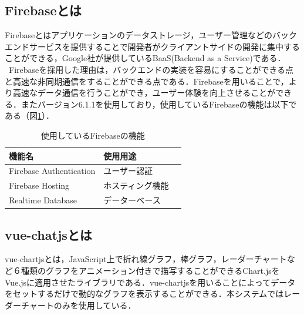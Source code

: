 \documentclass{funthesis}
\begin{document}
\subsection{Firebaseとは}
Firebaseとはアプリケーションのデータストレージ，ユーザー管理などのバックエンドサービスを提供することで開発者がクライアントサイドの開発に集中することができる，Google社が提供しているBaaS(Backend as a Service)である．\\
\ Firebaseを採用した理由は，バックエンドの実装を容易にすることができる点と高速な非同期通信をすることができる点である．Firebaseを用いることで，より高速なデータ通信を行うことができ，ユーザー体験を向上させることができる．またバージョン6.1.1を使用しており，使用しているFirebaseの機能は以下である（図\ref{Firebase}）．

\begin{table}[h]
\begin{center}
  \begin{tabular}{lll} \hline
  機能名&使用用途\tabularnewline \hline
    Firebase Authentication& ユーザー認証  \tabularnewline
    Firebase Hosting&ホスティング機能\tabularnewline
    Realtime Database &データーベース \tabularnewline
    \hline
  \end{tabular}
  \caption{使用しているFirebaseの機能}
  \label{Firebase}
  \end{center}
\end{table}


\subsection{vue-chatjsとは}
vue-chartjsとは，JavaScript上で折れ線グラフ，棒グラフ，レーダーチャートなど６種類のグラフをアニメーション付きで描写することができるChart.jsをVue.jsに適用させたライブラリである．vue-chartjsを用いることによってデータをセットするだけで動的なグラフを表示することができる．本システムではレーダーチャートのみを使用している．
\end{document}
